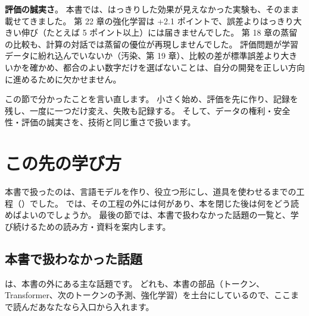 \textbf{評価の誠実さ}。
本書では、はっきりした効果が見えなかった実験も、そのまま載せてきました。
第 22 章の強化学習は +2.1 ポイントで、誤差よりはっきり大きい伸び（たとえば 5 ポイント以上）には届きませんでした。
第 18 章の蒸留の比較も、計算の対話では蒸留の優位が再現しませんでした。
評価問題が学習データに紛れ込んでいないか（汚染、第 19 章）、比較の差が標準誤差より大きいかを確かめ、都合のよい数字だけを選ばないことは、自分の開発を正しい方向に進めるために欠かせません。

この節で分かったことを言い直します。
小さく始め、評価を先に作り、記録を残し、一度に一つだけ変え、失敗も記録する。
そして、データの権利・安全性・評価の誠実さを、技術と同じ重さで扱います。

\section{この先の学び方}\label{sec:cap-learn}

本書で扱ったのは、言語モデルを作り、役立つ形にし、道具を使わせるまでの工程（）でした。
では、その工程の外には何があり、本を閉じた後は何をどう読めばよいのでしょうか。
最後の節では、本書で扱わなかった話題の一覧と、学び続けるための読み方・資料を案内します。

\subsection*{本書で扱わなかった話題}

は、本書の外にある主な話題です。
どれも、本書の部品（トークン、Transformer、次のトークンの予測、強化学習）を土台にしているので、ここまで読んだあなたなら入口から入れます。

